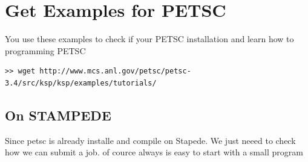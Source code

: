 \documentclass{article}
\begin{document}
\section{Get Examples for PETSC}
You use these examples to check if your PETSC installation and learn how to programming PETSC
\scriptsize
\begin{verbatim}
>> wget http://www.mcs.anl.gov/petsc/petsc-3.4/src/ksp/ksp/examples/tutorials/
\end{verbatim}
\normalsize

\subsection{On STAMPEDE}
Since petsc is already installe and compile on Stapede. We just neeed to check how we can submit a job. of cource always is easy to start with a small program 
\end{document}
